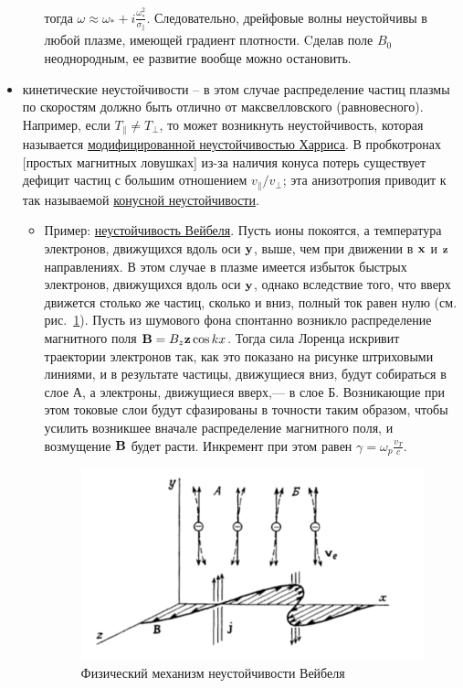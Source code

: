 \documentclass[10pt, a4paper]{article}
\begin{document}
\begin{itemize}
\begin{itemize}
		тогда $\omega \approx \omega_{*} + i \frac{\omega_{*}^2}{\sigma_\parallel}$. Следовательно, 
		дрейфовые волны неустойчивы в любой плазме, имеющей градиент плотности. Cделав
поле $B_0$ неоднородным, ее развитие вообще можно остановить.
		
	\end{itemize}

	\item кинетические неустойчивости -- в этом случае распределение частиц плазмы по скоростям должно быть отлично от максвелловского (равновесного). Например, если $T_\parallel\neq T_\perp$, то может возникнуть неустойчивость, которая называется \uline{модифицированной неустойчивостью Харриса}. В пробкотронах [простых магнитных ловушках] из-за наличия конуса потерь существует дефицит частиц с большим отношением $v_\parallel/v_\perp$; эта анизотропия приводит к так называемой \uline{конусной неустойчивости}.
	
	\begin{itemize}
		
		\item Пример: \uline{неустойчивость Вейбеля}.  Пусть ионы покоятся, а температура электронов, движущихся вдоль оси $\vb{y}$, выше, чем при движении в $\vb{x}$ и $\vb{z}$ направлениях. В этом случае в плазме имеется избыток быстрых электронов, движущихся вдоль оси $\vb{y}$, однако вследствие того, что вверх движется столько же частиц, сколько и вниз, полный ток равен нулю (см. рис.~\ref{fig:weibel_instability}). Пусть из шумового фона спонтанно возникло распределение магнитного поля $\vb{B} = B_z\vb{z} \cos{kx}$. Тогда сила Лоренца искривит траектории электронов так, как это показано на рисунке штриховыми линиями, и в результате частицы, движущиеся вниз, будут собираться в слое А, а электроны, движущиеся вверх,— в слое Б. Возникающие при этом токовые слои будут сфазированы в точности таким образом, чтобы усилить возникшее вначале распределение магнитного поля, и возмущение $\vb{B}$ будет расти. Инкремент при этом равен $\gamma = \omega_p\frac{v_T}{c}$.
				
		\begin{figure}[ht]
			\begin{center}
				\includegraphics[width=0.5\linewidth]{weibel_instability}
			\end{center}
			\caption{Физический механизм неустойчивости Вейбеля~\cite{chen}}
			\label{fig:weibel_instability} 
		\end{figure}
		
		
	\end{itemize}

\end{itemize}
\end{document}

